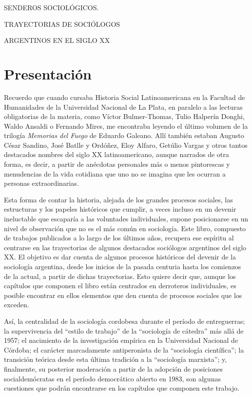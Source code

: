 
\frontmatter



\tableofcontents

SENDEROS SOCIOLÓGICOS.

TRAYECTORIAS DE SOCIÓLOGOS

ARGENTINOS EN EL SIGLO XX

\chapter{Presentación}

Recuerdo que cuando cursaba Historia Social Latinoamericana en la Facultad de Humanidades de la Universidad Nacional de La Plata, en paralelo a las lecturas obligatorias de la materia, como Víctor Bulmer-Thomas, Tulio Halperín Donghi, Waldo Ansaldi o Fernando Mires, me encontraba leyendo el último volumen de la trilogía \emph{Memorias del Fuego} de Eduardo Galeano. Allí también estaban Augusto César Sandino, José Batlle y Ordóñez, Eloy Alfaro, Getúlio Vargas y otros tantos destacados nombres del siglo XX latinoamericano, aunque narrados de otra forma, es decir, a partir de anécdotas personales más o menos pintorescas y menudencias de la vida cotidiana que uno no se imagina que les ocurran a personas extraordinarias.

Esta forma de contar la historia, alejada de los grandes procesos sociales, las estructuras y los papeles históricos que cumplir, a veces incluso en un devenir ineluctable que escaparía a las voluntades individuales, supone posicionarse en un nivel de observación que no es el más común en sociología. Este libro, compuesto de trabajos publicados a lo largo de los últimos años, recupera ese espíritu al centrarse en las trayectorias de algunos destacados sociólogos argentinos del siglo XX. El objetivo es dar cuenta de algunos procesos históricos del devenir de la sociología argentina, desde los inicios de la pasada centuria hasta los comienzos de la actual, a partir de dichas trayectorias. Esto quiere decir que, aunque los capítulos que componen el libro están centrados en derroteros individuales, es posible encontrar en ellos elementos que den cuenta de procesos sociales que los exceden.

Así, la centralidad de la sociología cordobesa durante el período de entreguerras; la supervivencia del ``estilo de trabajo'' de la ``sociología de cátedra'' más allá de 1957; el nacimiento de la investigación empírica en la Universidad Nacional de Córdoba; el carácter marcadamente antiperonista de la ``sociología científica''; la transición teórica desde esta última tradición a la ``sociología marxista''; y, finalmente, su posterior moderación a partir de la adopción de posiciones socialdemócratas en el período democrático abierto en 1983, son algunas cuestiones que podrán encontrarse en los capítulos que componen este trabajo.

